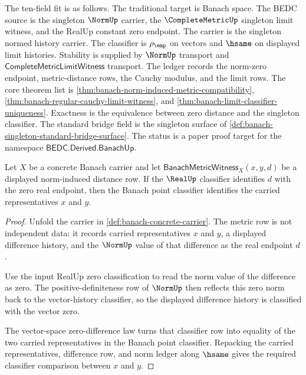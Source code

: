 The ten-field fit is as follows. The traditional target is Banach space. The
BEDC source is the singleton $\NormUp$ carrier, the $\CompleteMetricUp$
singleton limit witness, and the RealUp constant zero endpoint. The carrier is
the singleton normed history carrier. The classifier is $\rho_{\emp}$ on
vectors and $\hsame$ on displayed limit histories. Stability is supplied by
$\NormUp$ transport and $\mathsf{CompleteMetricLimitWitness}$ transport. The
ledger records the norm-zero endpoint, metric-distance rows, the Cauchy
modulus, and the limit rows. The core theorem list is
\autoref{thm:banach-norm-induced-metric-compatibility},
\autoref{thm:banach-regular-cauchy-limit-witness}, and
\autoref{thm:banach-limit-classifier-uniqueness}. Exactness is the equivalence
between zero distance and the singleton classifier. The standard bridge field
is the singleton surface of
\autoref{def:banach-singleton-standard-bridge-surface}. The status is a paper
proof target for the namespace $\mathsf{BEDC.Derived.BanachUp}$.

\begin{theorem}
\label{thm:banach-norm-distance-zero-exactness}
Let $X$ be a concrete Banach carrier and let
$\mathsf{BanachMetricWitness}_X(x,y,d)$ be a displayed norm-induced distance
row. If the $\RealUp$ classifier identifies $d$ with the zero real endpoint,
then the Banach point classifier identifies the carried representatives $x$
and $y$.
\end{theorem}
\begin{proof}
Unfold the carrier in \autoref{def:banach-concrete-carrier}. The metric row
is not independent data: it records carried representatives $x$ and $y$, a
displayed difference history, and the $\NormUp$ value of that difference as
the real endpoint $d$.

Use the input RealUp zero classification to read the norm value of the
difference as zero. The positive-definiteness row of $\NormUp$ then reflects
this zero norm back to the vector-history classifier, so the displayed
difference history is classified with the vector zero.

The vector-space zero-difference law turns that classifier row into equality
of the two carried representatives in the Banach point classifier. Repacking
the carried representatives, difference row, and norm ledger along $\hsame$
gives the required classifier comparison between $x$ and $y$.
\end{proof}


